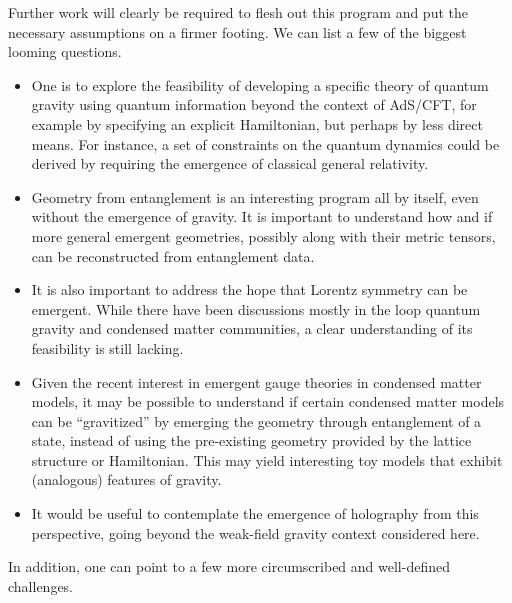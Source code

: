 \documentclass[%
12pt,preprint,
nofootinbib,
amsmath,amssymb,
aps,
prd,
showpacs,
superscriptaddress
]{revtex4-2}
\begin{document}
Further work will clearly be required to flesh out this program and put the necessary assumptions on a firmer footing.
We can list a few of the biggest looming questions.
\begin{itemize}
	\item One is to explore the feasibility of developing a specific theory of quantum gravity using quantum information beyond the context of AdS/CFT, for example by specifying an explicit Hamiltonian, but perhaps by less direct means. For instance, a set of constraints on the quantum dynamics could be derived by requiring the emergence of classical general relativity. 
	
	\item Geometry from entanglement is an interesting program all by itself, even without the emergence of gravity. It is important to understand how and if more general emergent geometries, possibly along with their metric tensors, can be reconstructed from entanglement data. 
	
	\item It is also important to address the hope that Lorentz symmetry can be emergent. While there have been discussions mostly in the loop quantum gravity and condensed matter communities, a clear understanding of its feasibility is still lacking. 
	
	\item Given the recent interest in emergent gauge theories in condensed matter models, it may be possible to understand if certain condensed matter models can be ``gravitized'' by emerging the geometry through entanglement of a state, instead of using the pre-existing geometry provided by the lattice structure or Hamiltonian. This may yield interesting toy models that exhibit (analogous) features of gravity.
	
	\item It would be useful to contemplate the emergence of holography from this perspective, going beyond the weak-field gravity context considered here.
\end{itemize}
In addition, one can point to a few more circumscribed and well-defined challenges.
\end{document}

